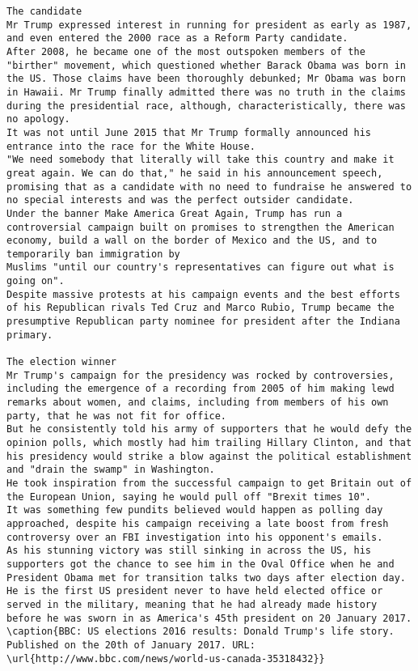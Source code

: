 \begin{lstlisting}
The candidate
Mr Trump expressed interest in running for president as early as 1987, and even entered the 2000 race as a Reform Party candidate. 
After 2008, he became one of the most outspoken members of the "birther" movement, which questioned whether Barack Obama was born in the US. Those claims have been thoroughly debunked; Mr Obama was born in Hawaii. Mr Trump finally admitted there was no truth in the claims during the presidential race, although, characteristically, there was no apology. 
It was not until June 2015 that Mr Trump formally announced his entrance into the race for the White House. 
"We need somebody that literally will take this country and make it great again. We can do that," he said in his announcement speech, promising that as a candidate with no need to fundraise he answered to no special interests and was the perfect outsider candidate. 
Under the banner Make America Great Again, Trump has run a controversial campaign built on promises to strengthen the American economy, build a wall on the border of Mexico and the US, and to temporarily ban immigration by 
Muslims "until our country's representatives can figure out what is going on". 
Despite massive protests at his campaign events and the best efforts of his Republican rivals Ted Cruz and Marco Rubio, Trump became the presumptive Republican party nominee for president after the Indiana primary. 
 
The election winner 
Mr Trump's campaign for the presidency was rocked by controversies, including the emergence of a recording from 2005 of him making lewd remarks about women, and claims, including from members of his own party, that he was not fit for office. 
But he consistently told his army of supporters that he would defy the opinion polls, which mostly had him trailing Hillary Clinton, and that his presidency would strike a blow against the political establishment and "drain the swamp" in Washington. 
He took inspiration from the successful campaign to get Britain out of the European Union, saying he would pull off "Brexit times 10". 
It was something few pundits believed would happen as polling day approached, despite his campaign receiving a late boost from fresh controversy over an FBI investigation into his opponent's emails. 
As his stunning victory was still sinking in across the US, his supporters got the chance to see him in the Oval Office when he and President Obama met for transition talks two days after election day. 
He is the first US president never to have held elected office or served in the military, meaning that he had already made history before he was sworn in as America's 45th president on 20 January 2017. 
\caption{BBC: US elections 2016 results: Donald Trump's life story. Published on the 20th of January 2017. URL: \url{http://www.bbc.com/news/world-us-canada-35318432}}
\end{lstlisting}

